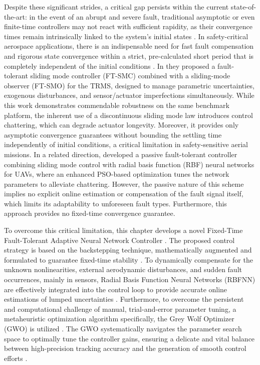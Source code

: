 Despite these significant strides, a critical gap persists within the current state-of-the-art: in the event of an abrupt and severe fault, traditional asymptotic or even finite-time controllers may not react with sufficient rapidity, as their convergence times remain intrinsically linked to the system's initial states \cite{Bhat2000, Polyakov2012}. In safety-critical aerospace applications, there is an indispensable need for fast fault compensation and rigorous state convergence within a strict, pre-calculated short period that is completely independent of the initial conditions \cite{fxt, Zuo2018}. In\cite{trms_smc} they proposed a fault-tolerant sliding mode controller (FT-SMC) combined with a sliding-mode observer (FT-SMO) for the TRMS, designed to manage parametric uncertainties, exogenous disturbances, and sensor/actuator imperfections simultaneously. While this work demonstrates commendable robustness on the same benchmark platform, the inherent use of a discontinuous sliding mode law introduces control chattering, which can degrade actuator longevity. Moreover, it provides only asymptotic convergence guarantees without bounding the settling time independently of initial conditions, a critical limitation in safety-sensitive aerial missions. In a related direction, \cite{zhang2025_rbf} developed a passive fault-tolerant controller combining sliding mode control with radial basis function (RBF) neural networks for UAVs, where an enhanced PSO-based optimization tunes the network parameters to alleviate chattering. However, the passive nature of this scheme implies no explicit online estimation or compensation of the fault signal itself, which limits its adaptability to unforeseen fault types. Furthermore, this approach provides no fixed-time convergence guarantee.

To overcome this critical limitation, this chapter develops a novel Fixed-Time Fault-Tolerant Adaptive Neural Network Controller \cite{my1article}. The proposed control strategy is based on the backstepping technique, mathematically augmented and formulated to guarantee fixed-time stability \cite{lemma2}. To dynamically compensate for the unknown nonlinearities, external aerodynamic disturbances, and sudden fault occurrences, mainly in sensors, Radial Basis Function Neural Networks (RBFNN) are effectively integrated into the control loop to provide accurate online estimations of lumped uncertainties \cite{Park1991, rbfnn1}. Furthermore, to overcome the persistent and computational challenge of manual, trial-and-error parameter tuning, a metaheuristic optimization algorithm specifically, the Grey Wolf Optimizer (GWO) is utilized \cite{gwo}. The GWO systematically navigates the parameter search space to optimally tune the controller gains, ensuring a delicate and vital balance between high-precision tracking accuracy and the generation of smooth control efforts \cite{9064786, glida_thesis}.

